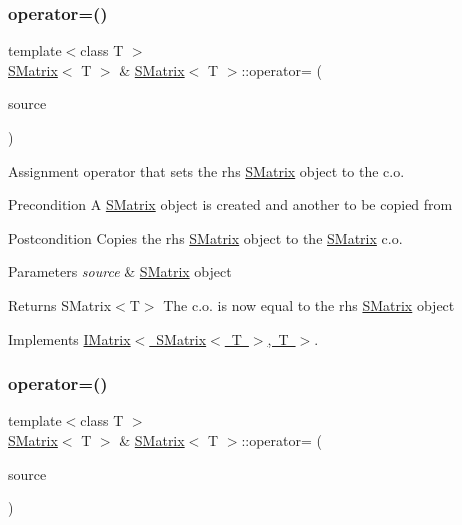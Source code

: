 \subsubsection{\texorpdfstring{operator=()}{operator=()}\hspace{0.1cm}{\footnotesize\ttfamily [1/2]}}
{\footnotesize\ttfamily template$<$class T $>$ \\
\mbox{\hyperlink{class_s_matrix}{S\+Matrix}}$<$ T $>$ \& \mbox{\hyperlink{class_s_matrix}{S\+Matrix}}$<$ T $>$\+::operator= (\begin{DoxyParamCaption}\item[{const \mbox{\hyperlink{class_s_matrix}{S\+Matrix}}$<$ T $>$ \&}]{source }\end{DoxyParamCaption})\hspace{0.3cm}{\ttfamily [virtual]}}



Assignment operator that sets the rhs \mbox{\hyperlink{class_s_matrix}{S\+Matrix}} object to the c.\+o. 

\begin{DoxyPrecond}{Precondition}
A \mbox{\hyperlink{class_s_matrix}{S\+Matrix}} object is created and another to be copied from 
\end{DoxyPrecond}
\begin{DoxyPostcond}{Postcondition}
Copies the rhs \mbox{\hyperlink{class_s_matrix}{S\+Matrix}} object to the \mbox{\hyperlink{class_s_matrix}{S\+Matrix}} c.\+o. 
\end{DoxyPostcond}

\begin{DoxyParams}{Parameters}
{\em source} & \mbox{\hyperlink{class_s_matrix}{S\+Matrix}} object \\
\hline
\end{DoxyParams}
\begin{DoxyReturn}{Returns}
S\+Matrix$<$\+T$>$ The c.\+o. is now equal to the rhs \mbox{\hyperlink{class_s_matrix}{S\+Matrix}} object 
\end{DoxyReturn}


Implements \mbox{\hyperlink{class_i_matrix_a9eeb68de7e1d37d1aab439c78fea9be3}{I\+Matrix$<$ S\+Matrix$<$ T $>$, T $>$}}.

\mbox{\label{class_s_matrix_ac10022d6890da5a33eaadf92c52af1e1}} 
\subsubsection{\texorpdfstring{operator=()}{operator=()}\hspace{0.1cm}{\footnotesize\ttfamily [2/2]}}
{\footnotesize\ttfamily template$<$class T $>$ \\
\mbox{\hyperlink{class_s_matrix}{S\+Matrix}}$<$ T $>$ \& \mbox{\hyperlink{class_s_matrix}{S\+Matrix}}$<$ T $>$\+::operator= (\begin{DoxyParamCaption}\item[{const \mbox{\hyperlink{class_matrix}{Matrix}}$<$ T $>$ \&}]{source }\end{DoxyParamCaption})}



